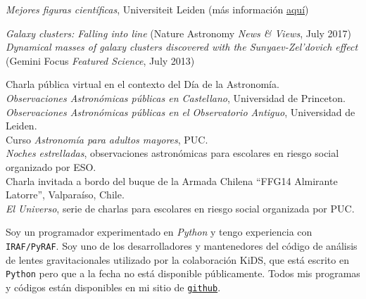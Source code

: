 \documentclass[11pt]{article}
\begin{document}

\noindent
{} \emph{Mejores figuras científicas}, Universiteit Leiden
(más información \href{https://home.strw.leidenuniv.nl/~kenworthy/teaching/better_figures/}{aquí})


\noindent
\emph{Galaxy clusters: Falling into line} (Nature Astronomy \emph{News \& 
Views}, July 2017)\\
\emph{Dynamical masses of galaxy clusters discovered with the Sunyaev-Zel'dovich 
effect} (Gemini Focus \emph{Featured Science}, July 2013)


\noindent
{} Charla pública virtual en el contexto del Día de la 
Astronomía.\\
 \emph{Observaciones Astronómicas públicas
en Castellano}, Universidad de Princeton.\\
 \emph{Observaciones Astronómicas públicas
en el Observatorio Antiguo}, Universidad de Leiden.\\
 Curso \emph{Astronomía para adultos mayores}, PUC.\\
 \emph{Noches estrelladas}, observaciones astronómicas para 
escolares en riesgo social organizado por ESO.\\
 Charla invitada a bordo del buque de la Armada Chilena ``FFG14 
Almirante Latorre'', Valpara\'iso, Chile.\\
 \emph{El Universo}, serie de charlas para escolares en riesgo 
social organizada por PUC.\\



Soy un programador experimentado en \textit{Python} y tengo experiencia con 
\texttt{IRAF/PyRAF}. Soy uno de los desarrolladores y mantenedores del código de 
análisis de lentes gravitacionales utilizado por la colaboración KiDS, que está 
escrito en \texttt{Python} pero que a la fecha no está disponible públicamente. 
Todos mis programas y códigos están disponibles en mi sitio de 
\href{https://github.com/cristobal-sifon}{\texttt{github}}.\\


\hline
\end{document}
